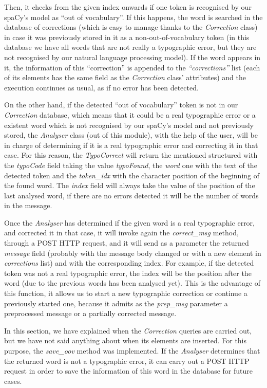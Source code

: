 Then, it checks from the given index onwards if one token is recognised by our spaCy's model as ``out of vocabulary''. If this happens, the word is searched in the database of corrections (which is easy to manage thanks to the \textit{Correction} class) in case it was previously stored in it as a non-out-of-vocabulary token (in this database we have all words that are not really a typographic error, but they are not recognised by our natural language processing model). If the word appears in it, the information of this ``correction'' is appended to the \textit{``corrections''} list (each of its elements has the same field as the \textit{Correction} class' attributes) and the execution continues as usual, as if no error has been detected.

On the other hand, if the detected ``out of vocabulary'' token is not in our \textit{Correction} database, which means that it could be a real typographic error or a existent word which is not recognised by our spaCy's model and not previously stored, the \textit{Analyser} class (out of this module), with the help of the user, will be in charge of determining if it is a real typographic error and correcting it in that case. For this reason, the \textit{TypoCorrect} will return the mentioned structured with the \textit{typoCode} field taking the value \textit{typoFound}, the \textit{word} one with the text of the detected token and the \textit{token\_idx} with the character position of the beginning of the found word. The \textit{index} field will always take the value of the position of the last analysed word, if there are no errors detected it will be the number of words in the message.

Once the \textit{Analyser} has determined if the given word is a real typographic error, and corrected it in that case, it will invoke again the \textit{correct\_msg} method, through a POST HTTP request, and it will send as a parameter the returned \textit{message} field (probably with the message body changed or with a new element in \textit{corrections} list) and with the corresponding index. For example, if the detected token was not a real typographic error, the index will be the position after the word (due to the previous words has been analysed yet). This is the advantage of this function, it allows us to start a new typographic correction or continue a previously started one, because it admits as the \textit{prep\_msg} parameter a preprocessed message or a partially corrected message.

In this section, we have explained when the \textit{Correction} queries are carried out, but we have not said anything about when its elements are inserted. For this purpose, the \textit{save\_oov} method was implemented. If the \textit{Analyser} determines that the returned word is not a typographic error, it can carry out a POST HTTP request in order to save the information of this word in the database for future cases.